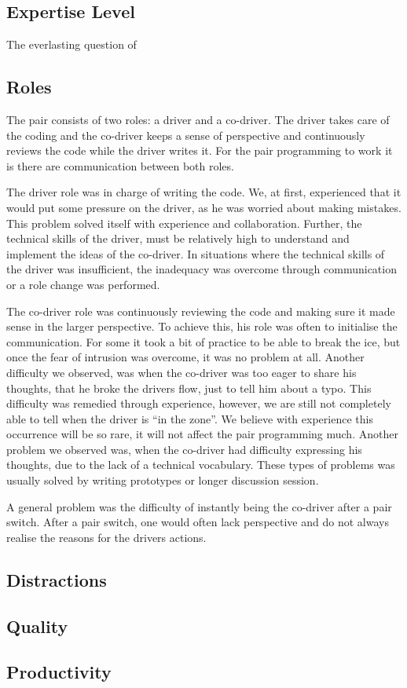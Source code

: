 \subsection{Expertise Level}
The everlasting question of 




\subsection{Roles}
The pair consists of two roles: a driver and a co-driver.
The driver takes care of the coding and the co-driver keeps a sense of perspective and continuously reviews the code while the driver writes it.
For the pair programming to work it is there are communication between both roles.

The driver role was in charge of writing the code.
We, at first, experienced that it would put some pressure on the driver, as he was worried about making mistakes.
This problem solved itself with experience and collaboration.
Further, the technical skills of the driver, must be relatively high to understand and implement the ideas of the co-driver.
In situations where the technical skills of the driver was insufficient, the inadequacy was overcome through communication or a role change was performed.

The co-driver role was continuously reviewing the code and making sure it made sense in the larger perspective.
To achieve this, his role was often to initialise the communication.
For some it took a bit of practice to be able to break the ice, but once the fear of intrusion was overcome, it was no problem at all.
Another difficulty we observed, was when the co-driver was too eager to share his thoughts, that he broke the drivers flow, just to tell him about a typo.
This difficulty was remedied through experience, however, we are still not completely able to tell when the driver is ``in the zone''.
We believe with experience this occurrence will be so rare, it will not affect the pair programming much.
Another problem we observed was, when the co-driver had difficulty expressing his thoughts, due to the lack of a technical vocabulary.
These types of problems was usually solved by writing prototypes or longer discussion session.

A general problem was the difficulty of instantly being the co-driver after a pair switch.
After a pair switch, one would often lack perspective and do not always realise the reasons for the drivers actions.


\subsection{Distractions}



\subsection{Quality}



\subsection{Productivity}


